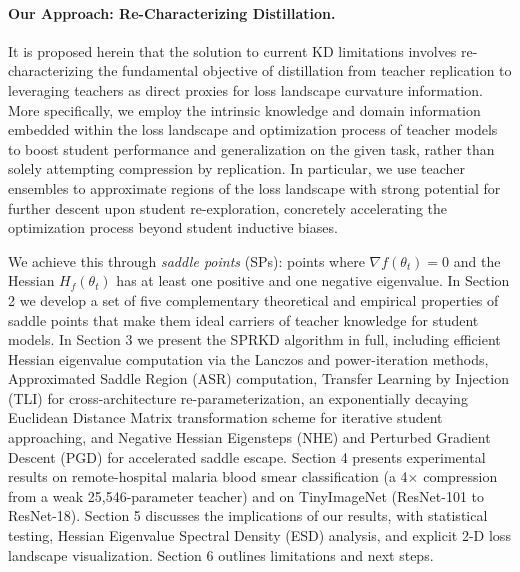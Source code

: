 \documentclass[letterpaper]{article}
\begin{document}
\paragraph{Our Approach: Re-Characterizing Distillation.}
It is proposed herein that the solution to current KD limitations involves re-characterizing the fundamental objective of distillation from teacher replication to leveraging teachers as direct proxies for loss landscape curvature information. More specifically, we employ the intrinsic knowledge and domain information embedded within the loss landscape and optimization process of teacher models to boost student performance and generalization on the given task, rather than solely attempting compression by replication. In particular, we use teacher ensembles to approximate regions of the loss landscape with strong potential for further descent upon student re-exploration, concretely accelerating the optimization process beyond student inductive biases.

We achieve this through \emph{saddle points} (SPs): points where $\nabla f(\theta_t) = 0$ and the Hessian $H_f(\theta_t)$ has at least one positive and one negative eigenvalue. In Section 2 we develop a set of five complementary theoretical and empirical properties of saddle points that make them ideal carriers of teacher knowledge for student models. In Section 3 we present the SPRKD algorithm in full, including efficient Hessian eigenvalue computation via the Lanczos and power-iteration methods, Approximated Saddle Region (ASR) computation, Transfer Learning by Injection (TLI) for cross-architecture re-parameterization, an exponentially decaying Euclidean Distance Matrix transformation scheme for iterative student approaching, and Negative Hessian Eigensteps (NHE) and Perturbed Gradient Descent (PGD) for accelerated saddle escape. Section 4 presents experimental results on remote-hospital malaria blood smear classification (a 4$\times$ compression from a weak 25{,}546-parameter teacher) and on TinyImageNet (ResNet-101 to ResNet-18). Section 5 discusses the implications of our results, with statistical testing, Hessian Eigenvalue Spectral Density (ESD) analysis, and explicit 2-D loss landscape visualization. Section 6 outlines limitations and next steps.
\end{document}
